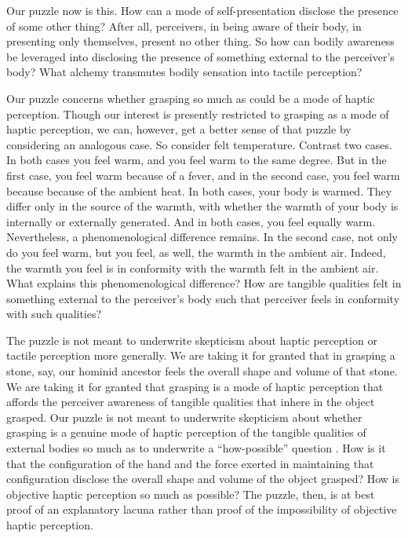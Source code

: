 Our puzzle now is this. How can a mode of self-presentation disclose the presence of some other thing? After all, perceivers, in being aware of their body, in presenting only themselves, present no other thing. So how can bodily awareness be leveraged into disclosing the presence of something external to the perceiver's body? What alchemy transmutes bodily sensation into tactile perception?

Our puzzle concerns whether grasping so much as could be a mode of haptic perception. Though our interest is presently restricted to grasping as a mode of haptic perception, we can, however, get a better sense of that puzzle by considering an analogous case. So consider felt temperature. Contrast two cases. In both cases you feel warm, and you feel warm to the same degree. But in the first case, you feel warm because of a fever, and in the second case, you feel warm because because of the ambient heat. In both cases, your body is warmed. They differ only in the source of the warmth, with whether the warmth of your body is internally or externally generated. And in both cases, you feel equally warm. Nevertheless, a phenomenological difference remains. In the second case, not only do you feel warm, but you feel, as well, the warmth in the ambient air. Indeed, the warmth you feel is in conformity with the warmth felt in the ambient air. What explains this phenomenological difference? How are tangible qualities felt in something external to the perceiver's body such that perceiver feels in conformity with such qualities?

The puzzle is not meant to underwrite skepticism about haptic perception or tactile perception more generally. We are taking it for granted that in grasping a stone, say, our hominid ancestor feels the overall shape and volume of that stone. We are taking it for granted that grasping is a mode of haptic perception that affords the perceiver awareness of tangible qualities that inhere in the object grasped. Our puzzle is not meant to underwrite skepticism about whether grasping is a genuine mode of haptic perception of the tangible qualities of external bodies so much as to underwrite a ``how-possible'' question \citep{Cassam:2007lq}. How is it that the configuration of the hand and the force exerted in maintaining that configuration disclose the overall shape and volume of the object grasped? How is objective haptic perception so much as possible? The puzzle, then, is at best proof of an explanatory lacuna rather than proof of the impossibility of objective haptic perception.

